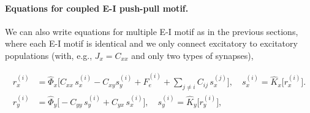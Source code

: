 \documentclass[12pt]{article}
\numberwithin{equation}{section}
\begin{document}
\paragraph{Equations for coupled  E-I push-pull motif.} We can also write equations for multiple E-I motif as in the previous sections, where each E-I motif is identical and we only connect excitatory to excitatory populations (with, e.g., $J_x = C_{xx}$ and only two types of synapses),
\begin{tcolorbox}[
  colback=gray!5,
  colframe=gray!5, %
  boxrule=0pt,
  enhanced, sharp corners,
  left=4pt, right=4pt, top=3pt, bottom=3pt,
  boxsep=2pt,
  before skip=6pt, after skip=6pt
]
 \begin{equation} \label{eq:NMM2-EI}
\begin{aligned}
    r^{(i)}_x &=  \hat \Phi_x \big [C_{xx}\, s_x^{(i)} -  C_{xy} s_y^{(i)} +   \hat F_{e}^{(i)}  +  \sum_{j\neq i} C_{ij} \, s_x^{(j)} ],  \quad 
 s_x^{(i)} = \hat K_x [r_x^{(i)} \big]. \\
  r_y^{(i)} &=  \hat \Phi_y \big[-C_{yy}\, s_y^{(i)} +  C_{yx} \, s_x^{(i)} ],  \quad 
 s_y^{(i)} = \hat K_y[r_y^{(i)}\big], 
\end{aligned}
\end{equation}
\end{tcolorbox}
\end{document}
